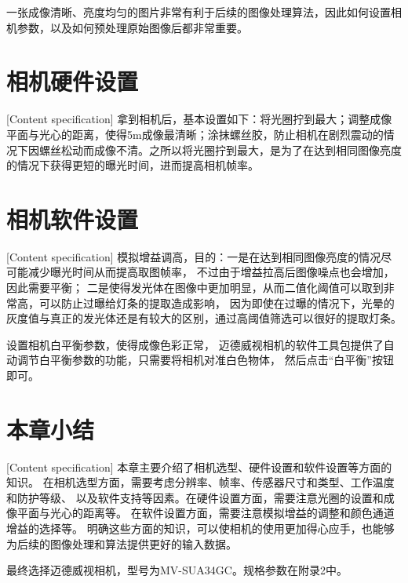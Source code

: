 一张成像清晰、亮度均匀的图片非常有利于后续的图像处理算法，因此如何设置相机参数，以及如何预处理原始图像后都非常重要。
\section{相机硬件设置}[Content specification]
拿到相机后，基本设置如下：将光圈拧到最大；调整成像平面与光心的距离，使得5m成像最清晰；涂抹螺丝胶，防止相机在剧烈震动的情况下因螺丝松动而成像不清。之所以将光圈拧到最大，是为了在达到相同图像亮度的情况下获得更短的曝光时间，进而提高相机帧率。
\section{相机软件设置}[Content specification]
模拟增益调高，目的：一是在达到相同图像亮度的情况尽可能减少曝光时间从而提高取图帧率，
不过由于增益拉高后图像噪点也会增加，因此需要平衡； 
二是使得发光体在图像中更加明显，从而二值化阈值可以取到非常高，可以防止过曝给灯条的提取造成影响，
因为即使在过曝的情况下，光晕的灰度值与真正的发光体还是有较大的区别，通过高阈值筛选可以很好的提取灯条。

设置相机白平衡参数，使得成像色彩正常，
迈德威视相机的软件工具包提供了自动调节白平衡参数的功能，只需要将相机对准白色物体，
然后点击“白平衡”按钮即可。

\section{本章小结}[Content specification]
本章主要介绍了相机选型、硬件设置和软件设置等方面的知识。
在相机选型方面，需要考虑分辨率、帧率、传感器尺寸和类型、工作温度和防护等级、
以及软件支持等因素。在硬件设置方面，需要注意光圈的设置和成像平面与光心的距离等。
在软件设置方面，需要注意模拟增益的调整和颜色通道增益的选择等。
明确这些方面的知识，可以使相机的使用更加得心应手，也能够为后续的图像处理和算法提供更好的输入数据。
\par
最终选择迈德威视相机，型号为MV-SUA34GC。规格参数在附录2中。
